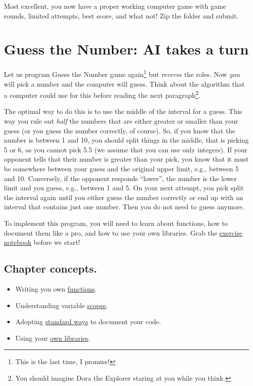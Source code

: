 \documentclass[
]{book}
\providecommand{\tightlist}{%
  \setlength{\itemsep}{0pt}\setlength{\parskip}{0pt}}
\begin{document}
Most excellent, you now have a proper working computer game with game rounds, limited attempts, best score, and what not! Zip the folder and submit.

\hypertarget{guess-the-number-ai}{%
\chapter{Guess the Number: AI takes a turn}\label{guess-the-number-ai}}

Let us program Guess the Number game again\footnote{This is the last time, I promise!} but \emph{reverse} the roles. Now \emph{you} will pick a number and the computer will guess. Think about the algorithm that a computer could use for this before reading the next paragraph\footnote{You should imagine Dora the Explorer staring at you while you think.}.

The optimal way to do this is to use the middle of the interval for a guess. This way you rule out \emph{half} the numbers that are either greater or smaller than your guess (or you guess the number correctly, of course). So, if you know that the number is between 1 and 10, you should split things in the middle, that is picking 5 or 6, as you cannot pick 5.5 (we assume that you can use only integers). If your opponent tells that their number is greater than your pick, you know that it must be somewhere between your guess and the original upper limit, e.g., between 5 and 10. Conversely, if the opponent responds ``lower'', the number is the lower limit and you guess, e.g., between 1 and 5. On your next attempt, you pick split the interval again until you either guess the number correctly or end up with an interval that contains just one number. Then you do not need to guess anymore.

To implement this program, you will need to learn about functions, how to document them like a pro, and how to use your own libraries. Grab the \href{notebooks/05.\%20Guess\%20the\%20number\%20-\%20AI.ipynb}{exercise notebook} before we start!

\hypertarget{chapter-concepts.}{%
\section{Chapter concepts.}\label{chapter-concepts.}}

\begin{itemize}
\tightlist
\item
  Writing you own \protect\hyperlink{function}{functions}.
\item
  Understanding variable \protect\hyperlink{scopes-for-immutable-values}{scopes}.
\item
  Adopting \protect\hyperlink{numpy-docstring}{standard ways} to document your code.
\item
  Using your \protect\hyperlink{using-you-own-libraries}{own libraries}.
\end{itemize}
\end{document}
